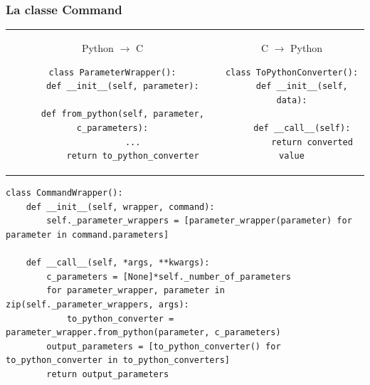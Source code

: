 \begin{frame}[fragile]
  \frametitle{La classe Command}
  \begin{center}
  {\tiny
    \begin{tabular}{c|c}
      \begin{minipage}{.4\linewidth}
        Python $\longrightarrow$ C
\begin{verbatim}
class ParameterWrapper():
    def __init__(self, parameter):

    def from_python(self, parameter, c_parameters):
        ...
        return to_python_converter
\end{verbatim}
      \end{minipage}
      &
      \begin{minipage}{.4\linewidth}
        C $\longrightarrow$ Python
\begin{verbatim}
class ToPythonConverter():
    def __init__(self, data):

    def __call__(self):
        return converted value
\end{verbatim}
      \end{minipage}
    \end{tabular}
  \vspace{1em}
\begin{verbatim}
class CommandWrapper():
    def __init__(self, wrapper, command):
        self._parameter_wrappers = [parameter_wrapper(parameter) for parameter in command.parameters]

    def __call__(self, *args, **kwargs):
        c_parameters = [None]*self._number_of_parameters
        for parameter_wrapper, parameter in zip(self._parameter_wrappers, args):
            to_python_converter = parameter_wrapper.from_python(parameter, c_parameters)
        output_parameters = [to_python_converter() for to_python_converter in to_python_converters]
        return output_parameters
\end{verbatim}}
\end{center}
\note{
    \begin{enumerate}
    \item 
    \end{enumerate}
  }
\end{frame}

